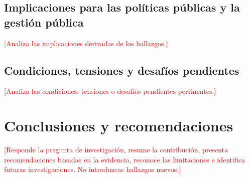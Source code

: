 \documentclass[Afour,sageh,times]{sagej}
\newcommand{\relleno}[1]{\textcolor{red}{[#1]}}
\begin{document}
\subsection{Implicaciones para las políticas públicas y la gestión pública}
\relleno{Analiza las implicaciones derivadas de los hallazgos.}

\subsection{Condiciones, tensiones y desafíos pendientes}
\relleno{Analiza las condiciones, tensiones o desafíos pendientes pertinentes.}


\section{Conclusiones y recomendaciones}
\relleno{Responde la pregunta de investigación, resume la contribución, presenta recomendaciones basadas en la evidencia, reconoce las limitaciones e identifica futuras investigaciones. No introduzcas hallazgos nuevos.}



\end{document}
